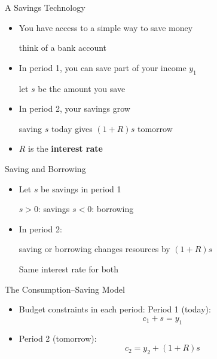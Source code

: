 \documentclass[10pt,aspectratio=169]{beamer}
\begin{document}
\begin{frame}{A Savings Technology}

\begin{itemize}
    \item You have access to a simple way to save money
    \begin{itemize}
        \itemvso think of a bank account
    \end{itemize}
    \vspace{0.3cm}

    \item In period 1, you can save part of your income \(y_1\)
    \begin{itemize}
        \itemvso let \(s\) be the amount you save
    \end{itemize}
    \vspace{0.3cm}

    \item In period 2, your savings grow
    \begin{itemize}
        \itemvso saving \(s\) today gives \( (1+R)s \) tomorrow
    \end{itemize}
    \vspace{0.3cm}

    \item \(R\) is the \textbf{interest rate}
\end{itemize}

\end{frame}

\begin{frame}{Saving and Borrowing}

\begin{itemize}
    \item Let \(s\) be savings in period 1
    \begin{itemize}
        \itemvso \(s > 0\): savings
        \itemvso \(s < 0\): borrowing
    \end{itemize}
    \vspace{0.3cm}

    \item In period 2:
    \begin{itemize}
        \itemvso saving or borrowing changes resources by \((1+R)s\)
    \end{itemize}

    \itemvso Same interest rate for both
\end{itemize}
\end{frame}

\begin{frame}{The Consumption--Saving Model}

\begin{itemize}
    \item Budget constraints in each period:
    \vspace{0.3cm}
    \itemvso Period 1 (today):
    \[
    c_1 + s = y_1
    \]
    \item Period 2 (tomorrow):
    \[
    c_2 = y_2 + (1+R)s
    \]
\end{itemize}

\end{frame}
\end{document}
